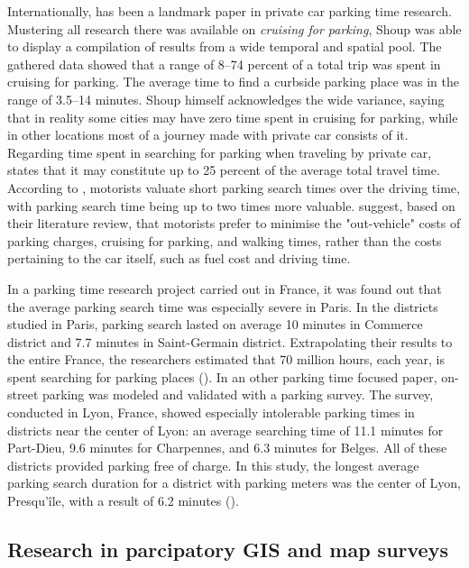 Internationally,  has been a landmark paper in private car parking time research. Mustering all research there was available on \textit{cruising for parking}, Shoup was able to display a compilation of results from a wide temporal and spatial pool. The gathered data showed that a range of 8--74 percent of a total trip was spent in cruising for parking. The average time to find a curbside parking place was in the range of 3.5--14 minutes. Shoup himself acknowledges the wide variance, saying that in reality some cities may have zero time spent in cruising for parking, while in other locations most of a journey made with private car consists of it. Regarding time spent in searching for parking when traveling by private car,  states that it may constitute up to 25 percent of the average total travel time. According to , motorists valuate short parking search times over the driving time, with parking search time being up to two times more valuable.  suggest, based on their literature review, that motorists prefer to minimise the "out-vehicle" costs of parking charges, cruising for parking, and walking times, rather than the costs pertaining to the car itself, such as fuel cost and driving time.

In a parking time research project carried out in France, it was found out that the average parking search time was especially severe in Paris. In the districts studied in Paris, parking search lasted on average 10 minutes in Commerce district and 7.7 minutes in Saint-Germain district. Extrapolating their results to the entire France, the researchers estimated that 70 million hours, each year, is spent searching for parking places (\cite{Gantelet2006}). In an other parking time focused paper, on-street parking was modeled and validated with a parking survey. The survey, conducted in Lyon, France, showed especially intolerable parking times in districts near the center of Lyon: an average searching time of 11.1 minutes for Part-Dieu, 9.6 minutes for Charpennes, and 6.3 minutes for Belges. All of these districts provided parking free of charge. In this study, the longest average parking search duration for a district with parking meters was the center of Lyon, Presqu'île, with a result of 6.2 minutes (\cite{Belloche2015}).

\newpage
\subsection{Research in parcipatory GIS and map surveys}
\justify

